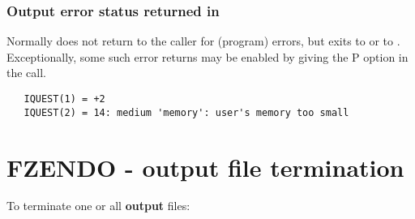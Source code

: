 \subsubsection*{Output error status returned in }

Normally  does not return to the caller for (program) errors,
but exits to  or to . 
Exceptionally, some such error
returns may be enabled by giving the P option in the call.

\begin{verbatim}
   IQUEST(1) = +2
   IQUEST(2) = 14: medium 'memory': user's memory too small
\end{verbatim}

\section{FZENDO - output file termination}

To terminate one or all \textbf{output} files:


